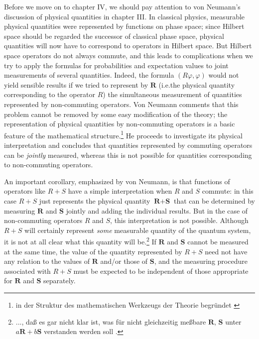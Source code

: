 \documentclass[11pt]{article}
\begin{document}
Before we move on to chapter IV, we should pay attention to von Neumann's discussion of physical quantities in chapter III. In classical physics, measurable physical quantities were represented by functions on phase space; since Hilbert space should be regarded the successor of classical phase space, physical quantities will now have to correspond to operators in Hilbert space. But Hilbert space operators do not always commute, and this leads to complications when we try to apply the formulas for probabilities and expectation values to joint measurements of several quantities. Indeed, the formula $(R\varphi, \varphi)$ would not yield sensible results if we tried to represent by $\textbf{R}$ (i.e.\@ the physical quantity corresponding to the operator $R$) the simultaneous measurement of quantities represented by non-commuting operators. Von Neumann comments that this problem cannot be removed by some easy modification of the theory; the representation of physical quantities by non-commuting operators is a basic feature of the mathematical structure.\footnote{in der Struktur des mathematischen Werkzeugs der Theorie begr\"{u}ndet \cite[p.\@ 110]{VN1}} He proceeds to investigate its physical interpretation and concludes that quantities represented by commuting operators can be \emph{jointly} measured, whereas this is not possible for quantities corresponding to non-commuting operators.

An important corollary, emphasized by von Neumann, is that functions of operators like $R + S$ have a simple interpretation when $R$ and $S$ commute: in this case $R + S$ just represents the physical quantity $\textbf{R} + \textbf{S}$ that can be determined by measuring $\textbf{R}$ and $\textbf{S}$ jointly and adding the individual results. But in the case of non-commuting operators $R$ and $S$, this interpretation is not possible. Although $R + S$ will certainly represent \emph{some} measurable quantity of the quantum system, it is not at all clear what this quantity will be.\footnote{..., da{\ss} es gar nicht klar ist, was f\"{u}r nicht gleichzeitig me{\ss}bare $\textbf{R}$, $\textbf{S}$ unter $a\textbf{R} + b\textbf{S}$ verstanden werden soll \cite[p.\@ 131]{VN1}.} If $\textbf{R}$ and $\textbf{S}$ cannot be measured at the same time, the value of the quantity represented by $R + S$ need not have any relation to the values of $\textbf{R}$ and/or those of $\textbf{S}$, and the measuring procedure associated with $R + S$ must be expected to be independent of those appropriate for $\textbf{R}$ and $\textbf{S}$ separately.
\end{document}
